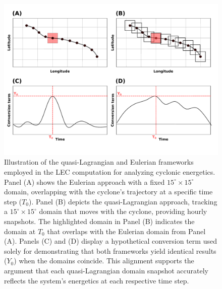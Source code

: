 \begin{figure}[h]
\centering
\includegraphics[width=\linewidth]{fig/LEC_argument.pdf}
\caption[LEC - discussion]{Illustration of the quasi-Lagrangian and Eulerian frameworks employed in the LEC computation for analyzing cyclonic energetics. Panel (A) shows the Eulerian approach with a fixed \(15^\circ \times 15^\circ\) domain, overlapping with the cyclone's trajectory at a specific time step ($T_0$). Panel (B) depicts the quasi-Lagrangian approach, tracking a \(15^\circ \times 15^\circ\) domain that moves with the cyclone, providing hourly snapshots. The highlighted domain in Panel (B) indicates the domain at $T_0$ that overlaps with the Eulerian domain from Panel (A). Panels (C) and (D) display a hypothetical conversion term used solely for demonstrating that both frameworks yield identical results ($Y_0$) when the domains coincide. This alignment supports the argument that each quasi-Lagrangian domain snapshot accurately reflects the system's energetics at each respective time step.}
\label{fig:lec_argument}
\end{figure}

